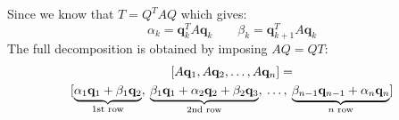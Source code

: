 Since we know that $T = Q^{T} A Q$ which gives:
\begin{equation*}
    \alpha_{k} = \mathbf{q}_{k}^{T} A \mathbf{q}_{k} \hspace{2em} \beta_{k} = \mathbf{q}_{k+1}^{T} A \mathbf{q}_{k}
\end{equation*}
The full decomposition is obtained by imposing $AQ = QT$:
\begin{gather*}
    \left[A\mathbf{q}_{1}, A\mathbf{q}_{2}, \dots, A\mathbf{q}_{n}\right] = \\
    [
        \underbrace{\alpha_{1}\mathbf{q}_{1} + \beta_{1}\mathbf{q}_{2}}_{\text{1st row}}, \:
        \underbrace{\beta_{1}\mathbf{q}_{1} + \alpha_{2}\mathbf{q}_{2} + \beta_{2}\mathbf{q}_{3}}_{\text{\text{2nd row}}}, \:
        \dots, \:
        \underbrace{\beta_{n-1}\mathbf{q}_{n-1} + \alpha_{n}\mathbf{q}_{n}}_{n \text{ row}}
    ]
\end{gather*}

\newpage

